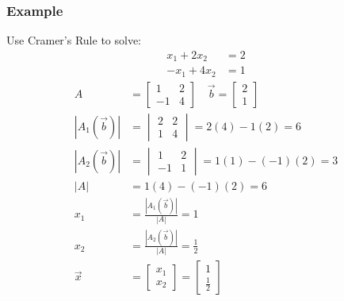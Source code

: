 \documentclass{math}
\begin{document}
\subsubsection*{Example}
Use Cramer's Rule to solve:
\begin{align*}
  x_1+2x_2 &= 2 \\
  -x_1+4x_2 &= 1
\end{align*}
\begin{align*}
  A &= \begin{bmatrix}
    1 & 2 \\
    -1 & 4
  \end{bmatrix} \quad \vec{b} = \begin{bmatrix}2 \\ 1\end{bmatrix} \\
  |A_1(\vec{b})| &= \begin{vmatrix}
    2 & 2 \\
    1 & 4
  \end{vmatrix} = 2(4)-1(2) = 6 \\
  |A_2(\vec{b})| &= \begin{vmatrix}
    1 & 2 \\
    -1 & 1
  \end{vmatrix} = 1(1)-(-1)(2) = 3 \\
  |A| &= 1(4)-(-1)(2) = 6 \\
  x_1 &= \frac{|A_1(\vec{b})|}{|A|} = 1 \\
  x_2 &= \frac{|A_2(\vec{b})|}{|A|} = \frac{1}{2} \\
  \vec{x} &= \begin{bmatrix}
    x_1 \\ x_2
  \end{bmatrix} = \begin{bmatrix}
    1 \\ \frac{1}{2}
  \end{bmatrix}
\end{align*}
\end{document}
